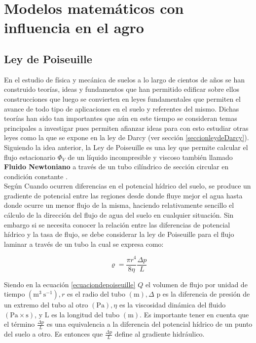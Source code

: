 \section{Modelos matemáticos con influencia en el agro}

\subsection{\textbf{Ley de Poiseuille}}

\label{seccionleydePoiseuille}
 
En el estudio de física y mecánica de suelos a lo largo de cientos de años se han construido teorías, ideas y fundamentos que han permitido edificar sobre ellos construcciones que luego se convierten en leyes fundamentales que permiten el avance de todo tipo de aplicaciones en el suelo y referentes del mismo. Dichas teorías han sido tan importantes que aún en este tiempo se consideran temas principales a investigar pues permiten afianzar ideas para con esto estudiar otras leyes como la que se expone en la ley de Darcy (ver sección \ref{seccionleydeDarcy}). Siguiendo la idea anterior, la Ley de Poiseuille es una ley que permite calcular el flujo estacionario $\Phi_{V}$ de un líquido incompresible y viscoso también llamado \textbf{Fluido Newtoniano} a través de un tubo cilíndrico de sección circular en condición constante \parencite{PFITZNER1976}.\\

Según \parencite{PFITZNER1976} Cuando ocurren diferencias en el potencial hídrico del suelo, se produce un gradiente de potencial entre las regiones desde donde fluye mejor el agua hasta donde ocurre un menor flujo de la misma, haciendo relativamente sencillo el cálculo de la dirección del flujo de agua del suelo en cualquier situación. Sin embargo si se necesita conocer la relación entre las diferencias de potencial hídrico y la tasa de flujo, se debe considerar la ley de Poiseuille para el flujo laminar a través de un tubo la cual se expresa como:

\begin{equation}
	\label{ecuaciondepoiseuille}
	\varrho=\frac{\pi r^{4}}{8 \eta} \frac{\Delta p}{L}
\end{equation} 

Siendo en la ecuación \eqref{ecuaciondepoiseuille} $Q$ el volumen de flujo por unidad de tiempo $\left(\mathrm{m}^{3} \mathrm{~s}^{-1}\right), r$ es el radio del tubo $(\mathrm{m}), \Delta$ p es la diferencia de presión de un extremo del tubo al otro $(\mathrm{Pa}), \eta$ es la viscosidad dinámica del fluido $(\mathrm{Pa} \times \mathrm{s})$, y $\mathrm{L}$ es la longitud del tubo $(\mathrm{m})$. Es importante tener en cuenta que el término $\frac{\Delta p}{L}$ es una equivalencia a la diferencia del potencial hídrico de un punto del suelo a otro. Es entonces que $\frac{\Delta p}{L}$ define al gradiente hidráulico.\\

